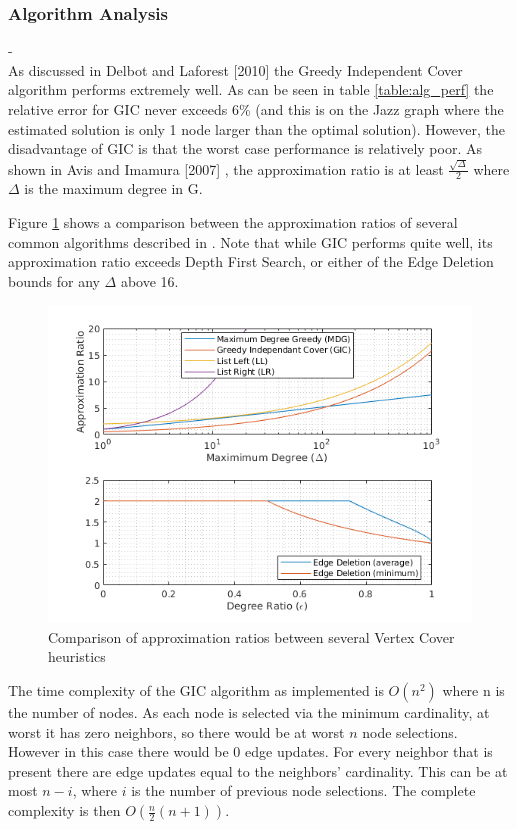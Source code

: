 \documentclass[acmlarge]{acmart}
\begin{document}
\subsubsection{Algorithm Analysis}\label{app_alg_analy}

-\\

As discussed in Delbot and Laforest [2010] \cite{Fran10} the Greedy Independent Cover algorithm performs extremely well. As can be seen in table \ref{table:alg_perf} the relative error for GIC never exceeds 6\% (and this is on the Jazz graph where the estimated solution is only 1 node larger than the optimal solution). However, the disadvantage of GIC is that the worst case performance is relatively poor. As shown in Avis and Imamura [2007] \cite{Avis06}, the approximation ratio is at least $\frac{\sqrt{\Delta}}{2}$ where $\Delta$ is the maximum degree in G.

Figure \ref{fig:approx_comp} shows a comparison between the approximation ratios of several common algorithms described in \cite{Fran10}. Note that while GIC performs quite well, its approximation ratio exceeds Depth First Search, or either of the Edge Deletion bounds for any $\Delta$ above 16.

\begin{figure}[h]
	\centering
	\includegraphics[width=0.8\linewidth]{ApproxRatioComp.png}
	\caption{Comparison of approximation ratios between several Vertex Cover heuristics}
	\label{fig:approx_comp}
\end{figure}



The time complexity of the GIC algorithm as implemented is $O(n^2)$ where n is the number of nodes. As each node is selected via the minimum cardinality, at worst it has zero neighbors, so there would be at worst $n$ node selections. However in this case there would be 0 edge updates. For every neighbor that is present there are edge updates equal to the neighbors' cardinality. This can be at most $n-i$, where $i$ is the number of previous node selections. The complete complexity is then $O(\frac{n}{2}(n+1))$.
\end{document}
